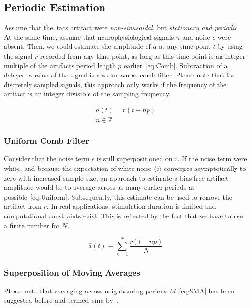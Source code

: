 \documentclass[a4paper]{article}
\begin{document}
\subsection{Periodic Estimation}
Assume that the~\gls{tacs} artifact were \emph{non-sinusoidal}, but \emph{stationary and periodic}. At the same time, assume that neurophysiological signals $n$ and noise $\epsilon$ were absent.
Then, we could estimate the amplitude of $a$ at any time-point $t$ by using the signal $r$ recorded from any time-point, as long as this time-point is an integer multiple of the artifacts period length $p$ earlier~\eqref{eq:Comb}.
Subtraction of a delayed version of the signal is also known as comb filter. Please note that for discretely sampled signals, this approach only works if the frequency of the artifact is an integer divisible of the sampling frequency.

\begin{eqnarray}
    \hat{a}(t) = r(t-np)\label{eq:Comb}\\
    n \in \mathbb{Z}
\end{eqnarray}

\subsubsection{Uniform Comb Filter}

Consider that the noise term $\epsilon$ is still superpositioned on $r$. If the noise term were white, and because the expectation of white noise $\langle\epsilon\rangle$ converges asymptotically to zero with increased sample size, an approach to estimate a bias-free  artifact amplitude would be to average across as many earlier periods as possible~\eqref{eq:Uniform}.
Subsequently, this estimate can be used to  remove the artifact from $r$.
In real applications, stimulation duration is limited and computational constraints exist. This is reflected by the fact that we have to use a finite number for $N$.

\begin{equation}
    \hat{a}(t) = \sum_{n=1}^{N} \frac{r(t - np)}{N}\label{eq:Uniform}
\end{equation}

\subsubsection{Superposition of Moving Averages}

Please note that averaging across neighbouring periods $M$~\eqref{eq:SMA} has been suggested before and termed~\gls{sma} by~\cite{Kohli_2015}.
\end{document}

